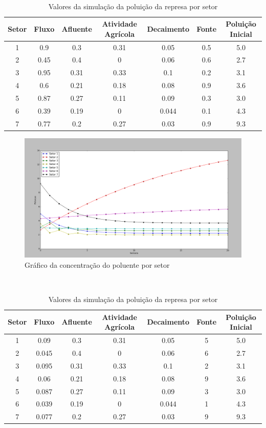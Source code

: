 \documentclass[a4paper]{article}
\begin{document}
\begin{enumerate}
\\
\begin{table}[h!]
\centering
\caption{Valores da simula\c{c}\~ao da polui\c{c}\~ao da represa por setor}
\begin{tabular}{|c|c|c|c|c|c|c|}
\hline
Setor &Fluxo 	& 	Afluente & Atividade Agr\'icola& Decaimento & Fonte & Polui\c{c}\~ao Inicial\\
\hline
1&0.9 	&	0.3	&	0.31		&	0.05	&	0.5	&	5.0	\\
2&0.45	&	0.4	&	0		&	0.06	&	0.6	&	2.7	\\
3&0.95	&	0.31	&	0.33		&	0.1	&	0.2	&	3.1	\\
4&0.6 	&	0.21	&	0.18		&	0.08	&	0.9	&	3.6	\\
5&0.87	&	0.27	&	0.11		&	0.09	&	0.3	&	3.0	\\
6&0.39	&	0.19	&	0		&	0.044	&	0.1	&	4.3	\\
7&0.77	&	0.2	&	0.27		&	0.03	&	0.9	&	9.3	\\
\hline
\end{tabular}
\end{table}

\begin{figure}[h]
\centering
\caption{Gr\'afico da concentra\c{c}\~ao do poluente por setor}
\includegraphics[scale=0.25]{simulacao1.png}
\end{figure}
\\
\begin{table}[h!]
\centering
\caption{Valores da simula\c{c}\~ao da polui\c{c}\~ao da represa por setor}
\begin{tabular}{|c|c|c|c|c|c|c|}
\hline
Setor &Fluxo 	& 	Afluente & Atividade Agr\'icola& Decaimento & Fonte & Polui\c{c}\~ao Inicial\\
\hline
1&0.09 	&	0.3	&	0.31		&	0.05	&	5	&	5.0	\\
2&0.045	&	0.4	&	0		&	0.06	&	6	&	2.7	\\
3&0.095	&	0.31	&	0.33		&	0.1	&	2	&	3.1	\\
4&0.06 	&	0.21	&	0.18		&	0.08	&	9	&	3.6	\\
5&0.087	&	0.27	&	0.11		&	0.09	&	3	&	3.0	\\
6&0.039	&	0.19	&	0		&	0.044	&	1	&	4.3	\\
7&0.077	&	0.2	&	0.27		&	0.03	&	9	&	9.3	\\
\hline
\end{tabular}
\end{table}


\end{enumerate}
\end{document}
